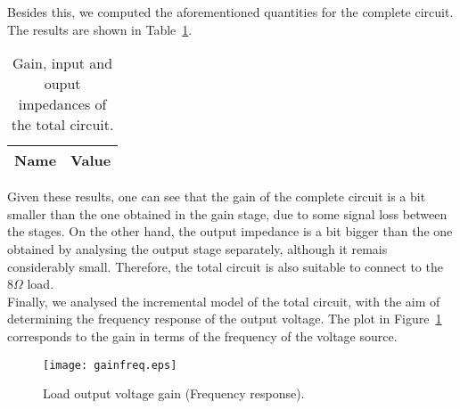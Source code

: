 Besides this, we computed the aforementioned quantities for the complete circuit. The results are shown in Table~\ref{tab:totaltab}.

\begin{table}[H]
  \centering
  \begin{tabular}{|l|r|}
    \hline    
    {\bf Name} & {\bf Value} \\ \hline
    
  \end{tabular}
  \caption{Gain, input and ouput impedances of the total circuit.}
  \label{tab:totaltab}
\end{table}

Given these results, one can see that the gain of the complete circuit is a bit smaller than the one obtained in the gain stage, due to some signal loss between the stages. On the other hand, the output impedance is a bit bigger than the one obtained by analysing the output stage separately, although it remais considerably small. Therefore, the total circuit is also suitable to connect to the $8\Omega$ load.\\

Finally, we analysed the incremental model of the total circuit, with the aim of determining the frequency response of the output voltage. The plot in Figure~\ref{fig:freqresp} corresponds to the gain in terms of the frequency of the voltage source.

\begin{figure}[H] \centering
\texttt{[image: gainfreq.eps]}
\caption{Load output voltage gain (Frequency response).}
\label{fig:freqresp}
\end{figure}
